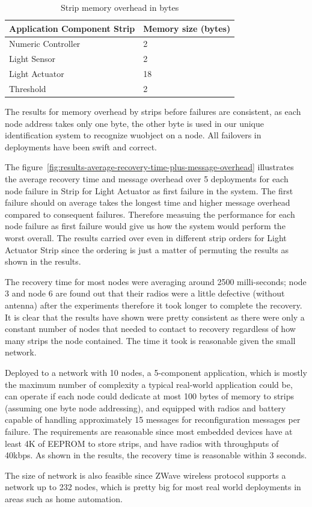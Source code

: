 \begin{table}
\centering
\caption{Strip memory overhead in bytes}
\label{tbl:results-memory-overhead-strip}
  \begin{tabular}{|l|l|}
  \hline
  \textbf{Application Component Strip} & \textbf{Memory size (bytes)} \\
  \hline
  Numeric Controller & 2 \\
  \hline
  Light Sensor & 2 \\
  \hline
  Light Actuator & 18 \\
  \hline
  Threshold & 2 \\
  \hline
  \end{tabular}
\end{table}

The results for memory overhead by strips before failures are consistent, as
each node address takes only one byte, the other byte is used in our unique
identification system to recognize wuobject on a node. All failovers in
deployments have been swift and correct.

The figure~\ref{fig:results-average-recovery-time-plus-message-overhead}
illustrates the average recovery time and message overhead over 5 deployments
for each node failure in Strip for Light Actuator as first failure in the
system. The first failure should on average takes the longest time and higher
message overhead compared to consequent failures. Therefore measuing the
performance for each node failure as first failure would give us how the system
would perform the worst overall. The results carried over even in different
strip orders for Light Actuator Strip since the ordering is just a matter of
permuting the results as shown in the results.

The recovery time for most nodes were averaging around 2500 milli-seconds; node
3 and node 6 are found out that their radios were a little defective (without
antenna) after the experiments therefore it took longer to complete the
recovery. It is clear that the results have shown were pretty consistent as
there were only a constant number of nodes that needed to contact to recovery
regardless of how many strips the node contained. The time it took is reasonable
given the small network.


Deployed to a network with 10 nodes, a 5-component application, which is mostly
the maximum number of complexity a typical real-world application could be, can
operate if each node could dedicate at most 100 bytes of memory to strips
(assuming one byte node addressing), and equipped with radios and battery
capable of handling approximately 15 messages for reconfiguration messages per
failure. The requirements are reasonable since most embedded devices have at
least 4K of EEPROM to store strips, and have radios with throughputs of 40kbps.
As shown in the results, the recovery time is reasonable within 3 seconds.

The size of network is also feasible since ZWave wireless protocol supports
a network up to 232 nodes, which is pretty big for most real world deployments
in areas such as home automation. 

